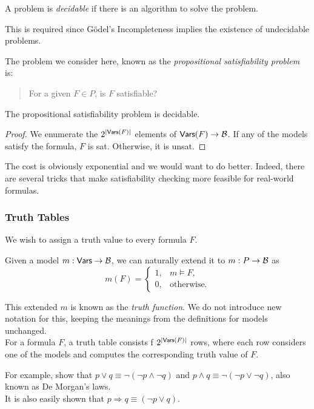 \begin{fdef}
A problem is \textit{decidable} if there is an algorithm to solve the problem.
\end{fdef}

This is required since G\"odel's Incompleteness implies the existence of undecidable problems.

The problem we consider here, known as the \textit{propositional satisfiability problem} is:
\begin{quote}
For a given $F\in P$, is $F$ satisfiable?
\end{quote}

\begin{theorem}
The propositional satisfiability problem is decidable.
\end{theorem}
\begin{proof}
We enumerate the $2^{|\mathsf{Vars}(F)|}$ elements of $\mathsf{Vars}(F)\to\mathcal{B}$. If any of the models satisfy the formula, $F$ is sat. Otherwise, it is unsat.
\end{proof}

The cost is obviously exponential and we would want to do better. Indeed, there are several tricks that make satisfiability checking more feasible for real-world formulas.

\subsubsection{Truth Tables}

We wish to assign a truth value to every formula $F$.

Given a model $m:\mathsf{Vars}\to\mathcal{B}$, we can naturally extend it to $m:P\to \mathcal{B}$ as
\[
    m(F) = 
    \begin{cases}
    1, & m\vDash F, \\
    0, & \text{otherwise.}
    \end{cases}
\]

This extended $m$ is known as the \textit{truth function}. We do not introduce new notation for this, keeping the meanings from the definitions for models unchanged.\\

For a formula $F$, a truth table consists f $2^{|\mathsf{Vars}(F)|}$ rows, where each row considers one of the models and computes the corresponding truth value of $F$.

For example, show that $p\vee q \equiv \neg(\neg p \wedge \neg q)$ and $p\wedge q \equiv \neg(\neg p \vee \neg q)$, also known as De Morgan's laws.\\
It is also easily shown that $p\Rightarrow q \equiv (\neg p \vee q)$.

